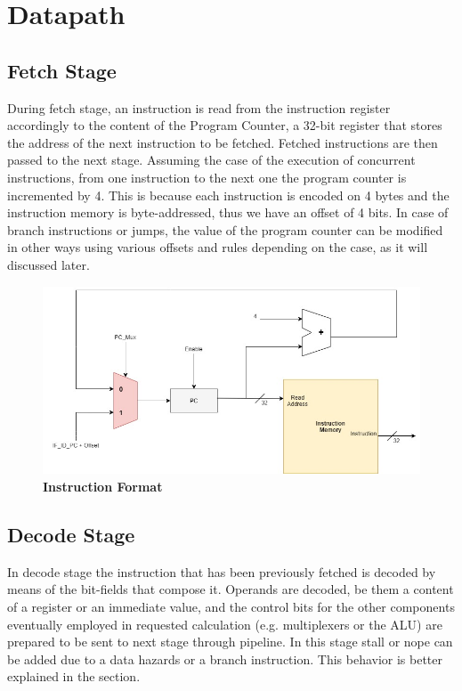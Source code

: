 %
 
\chapter{Datapath}
\label{cha2}
\section{Fetch Stage}
During fetch stage, an instruction is read from the instruction register accordingly to the content of the Program Counter, a 32-bit register that stores the address 
of the next instruction to be fetched. Fetched instructions are then passed to the next stage.
Assuming the case of the execution of concurrent instructions, from one instruction to the next one the program counter is incremented by 4. This is because each instruction 
is encoded on 4 bytes and the instruction memory is byte-addressed, thus we have an offset of 4 bits.
In case of branch instructions or jumps, the value of the program counter can be modified in other ways using various offsets and rules depending on the case, 
as it will discussed later.

\begin{figure}[!h]
    \centering
        \includegraphics[width=\linewidth]{schematic/InstructionMemory_withProgramCounter.jpg}
        \caption{\textbf{Instruction Format}}
\end{figure}
    

\section{Decode Stage}

In decode stage the instruction that has been previously fetched is decoded by means of the bit-fields that compose it.
Operands are decoded, be them a content of a register or an immediate value, and the control bits for the other components eventually employed in requested calculation 
(e.g. multiplexers or the ALU) are prepared to be sent to next stage through pipeline. In this stage stall or nope can be 
added due to a data hazards or a branch instruction. This behavior is better explained in the section.

